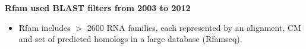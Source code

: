 \documentclass[landscape]{slides}
\begin{document}
\begin{slide}
\begin{center}

\textbf{Rfam used BLAST filters from 2003 to 2012}

\end{center}

\begin{itemize}
\item Rfam includes $>$ 2600 RNA families, each represented by an
  alignment, CM and set of predicted homologs in a large database (Rfamseq).
\end{itemize}


\vfill
\end{slide}
\end{document}
